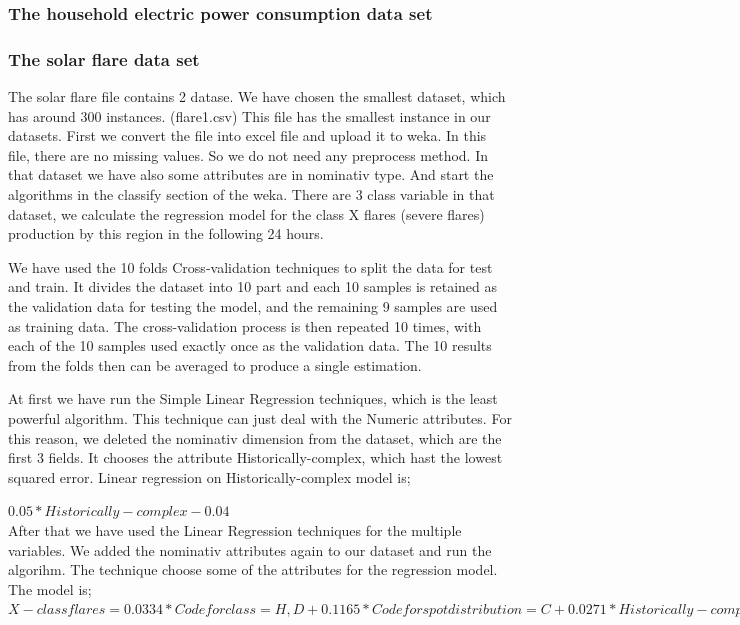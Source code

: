 \documentclass[a4paper]{article}
\begin{document}
\subsubsection{The household electric power consumption data set}
\subsubsection{The solar flare data set}
The solar flare file contains 2 datase. We have chosen the smallest dataset, which has around 300 instances. (flare1.csv) This file has the smallest instance in our datasets. First we convert the file into excel file and upload it to weka. In this file, there are no missing values. So we do not need any preprocess method. In that dataset we have also some attributes are in nominativ type. And start the algorithms in the classify section of the weka. There are 3 class variable in that dataset, we calculate the regression model for the class X flares (severe flares) production by this region in the following 24 hours. 

We have used the 10 folds Cross-validation techniques to split the data for test and train. It divides the dataset into 10 part and each 10 samples is retained as the validation data for testing the model, and the remaining 9 samples are used as training data. The cross-validation process is then repeated 10 times, with each of the 10 samples used exactly once as the validation data. The 10 results from the folds then can be averaged to produce a single estimation.  

At first we have run the Simple Linear Regression techniques, which is the least powerful algorithm. This technique can just deal with the Numeric attributes. For this reason, we deleted the nominativ dimension from the dataset, which are the first 3 fields. It chooses the attribute Historically-complex, which hast the lowest squared error. Linear regression on Historically-complex model is; 

$0.05 * Historically-complex - 0.04$\\

After that we have used the Linear Regression techniques for the multiple variables. We added the nominativ attributes again to our dataset and run the algorihm. The technique choose some of the attributes for the regression model. The model is;\\

$   X-class flares =   0.0334 * Code for class=H,D +
      0.1165 * Code for spot distribution=C +
      0.0271 * Historically-complex +
     -0.038 $\\
\end{document}
